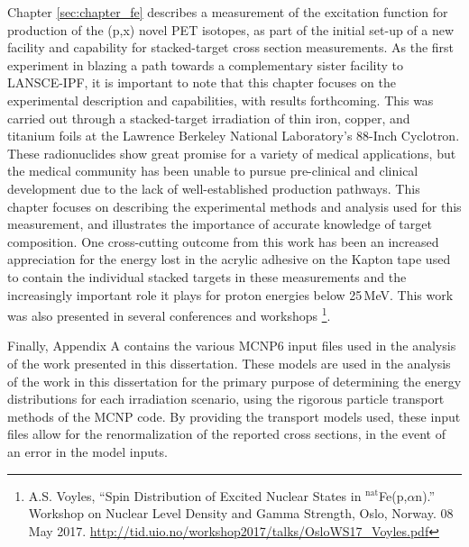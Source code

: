 Chapter \ref{sec:chapter_fe}  describes a measurement of the excitation function for production of the  (p,x) novel PET isotopes, as part of the initial set-up of a new facility and capability for stacked-target cross section measurements.
As the first experiment in blazing a path towards a complementary sister facility to LANSCE-IPF, it is important to note that this chapter focuses on the experimental description and capabilities, with results forthcoming.
This was carried out through a stacked-target irradiation of thin iron, copper, and titanium foils at the Lawrence Berkeley National Laboratory's 88-Inch Cyclotron.
These radionuclides show great promise for a variety of medical applications, but the medical community has been unable to pursue pre-clinical and clinical development due to the lack of well-established production pathways.
This chapter focuses on describing the experimental methods and analysis used for this measurement, and illustrates the importance of accurate knowledge of target composition.
One cross-cutting outcome from this work has been an increased appreciation for the energy lost in the acrylic adhesive on the Kapton tape used to contain the individual stacked targets in these measurements
and the
increasingly important role it plays for proton energies below 25\,MeV. 
This work was also presented in several conferences and workshops \footnotemark[1] \footnote{A.S. Voyles, \enquote{Spin Distribution of Excited Nuclear States in $^{\text{nat}}$Fe(p,$\alpha$n).}  Workshop on Nuclear Level Density and Gamma Strength, Oslo, Norway. 08 May 2017. \url{http://tid.uio.no/workshop2017/talks/OsloWS17_Voyles.pdf}}.





Finally, Appendix A  contains the various MCNP6 input files used in the analysis of the work presented in this dissertation. 
These models are  used in the analysis of the work in this dissertation for the primary purpose of determining the energy distributions for each irradiation scenario, using the rigorous particle transport methods of the MCNP code.
By providing the transport models used, these input files allow for the renormalization of the reported cross sections, in the event of an error in the model inputs.


